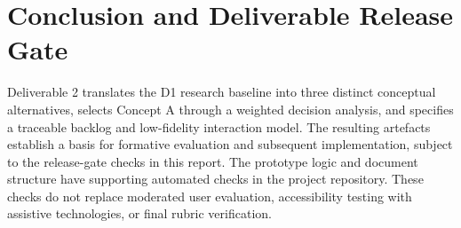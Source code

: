\documentclass[12pt,a4paper]{article}
\begin{document}
\section{Conclusion and Deliverable Release Gate}

Deliverable 2 translates the D1 research baseline into three distinct conceptual alternatives, selects Concept A through a weighted decision analysis, and specifies a traceable backlog and low-fidelity interaction model. The resulting artefacts establish a basis for formative evaluation and subsequent implementation, subject to the release-gate checks in this report. The prototype logic and document structure have supporting automated checks in the project repository. These checks do not replace moderated user evaluation, accessibility testing with assistive technologies, or final rubric verification.
\end{document}
